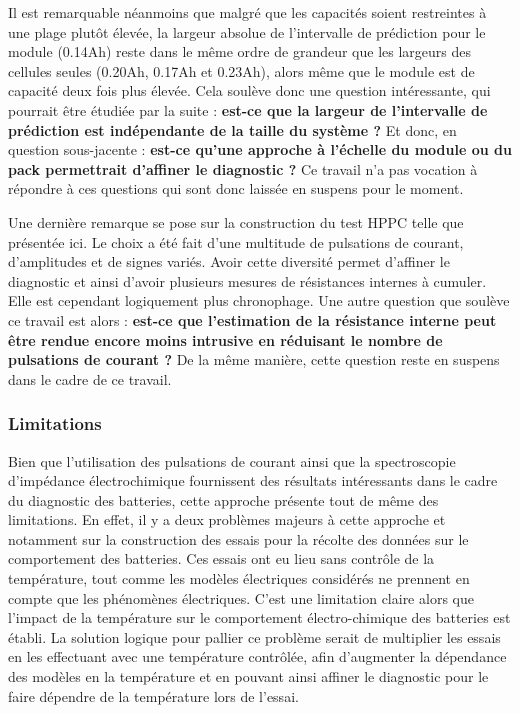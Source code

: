 Il est remarquable néanmoins que malgré que les capacités soient restreintes à une plage plutôt élevée, la largeur absolue de l'intervalle de prédiction pour le module (0.14Ah) reste dans le même ordre de grandeur que les largeurs des cellules seules (0.20Ah, 0.17Ah et 0.23Ah), alors même que le module est de capacité deux fois plus élevée. Cela soulève donc une question intéressante, qui pourrait être étudiée par la suite : \textbf{est-ce que la largeur de l'intervalle de prédiction est indépendante de la taille du système ?} Et donc, en question sous-jacente : \textbf{est-ce qu'une approche à l’échelle du module ou du pack permettrait d'affiner le diagnostic ?} Ce travail n'a pas vocation à répondre à ces questions qui sont donc laissée en suspens pour le moment. 

Une dernière remarque se pose sur la construction du test HPPC telle que présentée ici. Le choix a été fait d'une multitude de pulsations de courant, d'amplitudes et de signes variés. Avoir cette diversité permet d'affiner le diagnostic et ainsi d'avoir plusieurs mesures de résistances internes à cumuler. Elle est cependant logiquement plus chronophage. Une autre question que soulève ce travail est alors : \textbf{est-ce que l'estimation de la résistance interne peut être rendue encore moins intrusive en réduisant le nombre de pulsations de courant ?} De la même manière, cette question reste en suspens dans le cadre de ce travail.

\subsubsection{Limitations}
Bien que l'utilisation des pulsations de courant ainsi que la spectroscopie d'impédance électrochimique fournissent des résultats intéressants dans le cadre du diagnostic des batteries, cette approche présente tout de même des limitations. En effet, il y a deux problèmes majeurs à cette approche et notamment sur la construction des essais pour la récolte des données sur le comportement des batteries. Ces essais ont eu lieu sans contrôle de la température, tout comme les modèles électriques considérés ne prennent en compte que les phénomènes électriques. C'est une limitation claire alors que l'impact de la température sur le comportement électro-chimique des batteries est établi. La solution logique pour pallier ce problème serait de multiplier les essais en les effectuant avec une température contrôlée, afin d'augmenter la dépendance des modèles en la température et en pouvant ainsi affiner le diagnostic pour le faire dépendre de la température lors de l'essai. 

